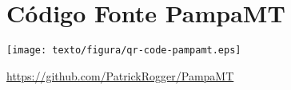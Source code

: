 \chapter{Código Fonte PampaMT}
    
    \vspace*{5cm} 
    
    \begin{figure*}[h]
        \begin{center}
            \texttt{[image: texto/figura/qr-code-pampamt.eps]}
        \end{center}
    \end{figure*}
    
    \begin{center}
        \url{https://github.com/PatrickRogger/PampaMT}
    \end{center}

    \vfill
